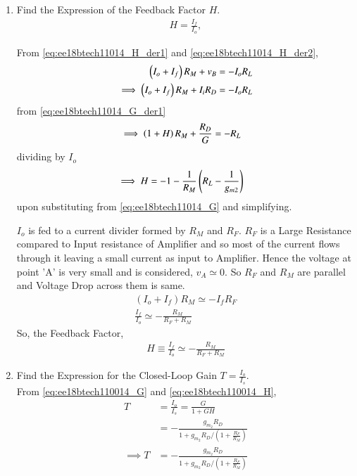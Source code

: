 \begin{enumerate}[label=\thesection.\arabic*.,ref=\thesection.\theenumi]
\item Find the Expression of the Feedback Factor $H$.
\\
\solution 
\begin{align}
H = \frac{I_{f}}{I_{o}},
\end{align}


From \eqref{eq:ee18btech11014_H_der1}
 and \eqref{eq:ee18btech11014_H_der2},
\begin{align}
\left(I_o + I_f\right)R_M + v_{B} &= -I_oR_L
\\
\implies \left(I_o + I_f\right)R_M + I_iR_D &=-I_oR_L 
\end{align}
from  \eqref{eq:ee18btech11014_G_der1}
\begin{align}
\implies \left(1 + H\right)R_M + \frac{R_D}{G} &=-R_L 
\end{align}
dividing by  $I_o $
\begin{align}
\implies H &= -1 - \frac{1}{R_M} \left(R_L -\frac{1}{g_{m2}}\right)
\end{align}
upon  substituting from  \eqref{eq:ee18btech11014_G} and simplifying.


$I_{o}$ is fed to a current divider formed by $R_{M}$ and $R_{F}$.
$R_{F}$ is a Large Resistance compared to Input resistance of Amplifier and so most of the current flows through it leaving a small current as input to Amplifier. Hence the voltage at point 'A' is very small and is considered, $v_{A} \simeq 0$. So $R_{F}$ and $R_{M}$ are parallel and Voltage Drop across them is same.
\begin{align}
(I_{o} + I_{f})R_{M} \simeq -I_{f}R_{F}\\
\frac{I_{f}}{I_{o}} \simeq -\frac{R_{M}}{R_{F}+R_{M}}
\end{align}
So, the Feedback Factor,
\begin{align}
\label{eq:ee18btech110014_H}
H \equiv \frac{I_{f}}{I_{o}} \simeq-\frac{R_{M}}{R_{F}+R_{M}}
\end{align}
\item Find the Expression for the Closed-Loop Gain $T=\frac{I_{o}}{I_{s}}$. 
\\
\solution 
From \eqref{eq:ee18btech110014_G}
 and \eqref{eq:ee18btech110014_H},
\begin{align}
\label{eq:ee18btech110014_T}
T &= \frac{I_{o}}{I_{s}} = \frac{G}{1+GH}\\
&=-\frac{g_{m_{2}} R_{D}}{1+g_{m_{2}} R_{D} /\left(1+\frac{R_{F}}{R_{M}}\right)}
\\
\implies T &= -\frac{g_{m_{2}} R_{D}}{1+g_{m_{2}} R_{D} /\left(1+\frac{R_{F}}{R_{M}}\right)}
\end{align}

\end{enumerate}
